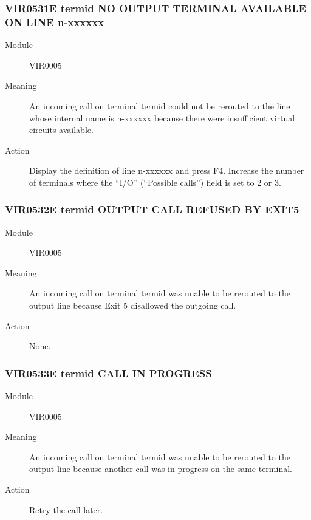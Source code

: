 \documentclass[letterpaper,10pt,english]{sphinxmanual}
\begin{document}
\subsubsection{VIR0531E termid NO OUTPUT TERMINAL AVAILABLE ON LINE n-xxxxxx}
\label{\detokenize{messages:vir0531e-termid-no-output-terminal-available-on-line-n-xxxxxx}}\begin{description}
\item[{Module}] \leavevmode
VIR0005

\item[{Meaning}] \leavevmode
An incoming call on terminal termid could not be rerouted to the line whose internal name is n-xxxxxx because there were insufficient virtual circuits available.

\item[{Action}] \leavevmode
Display the definition of line n-xxxxxx and press F4. Increase the number of terminals where the “I/O” (“Possible calls”) field is set to 2 or 3.

\end{description}


\subsubsection{VIR0532E termid OUTPUT CALL REFUSED BY EXIT5}
\label{\detokenize{messages:vir0532e-termid-output-call-refused-by-exit5}}\begin{description}
\item[{Module}] \leavevmode
VIR0005

\item[{Meaning}] \leavevmode
An incoming call on terminal termid was unable to be rerouted to the output line because Exit 5 disallowed the outgoing call.

\item[{Action}] \leavevmode
None.

\end{description}


\subsubsection{VIR0533E termid CALL IN PROGRESS}
\label{\detokenize{messages:vir0533e-termid-call-in-progress}}\begin{description}
\item[{Module}] \leavevmode
VIR0005

\item[{Meaning}] \leavevmode
An incoming call on terminal termid was unable to be rerouted to the output line because another call was in progress on the same terminal.

\item[{Action}] \leavevmode
Retry the call later.

\end{description}
\end{document}
